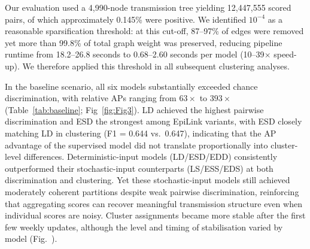 \documentclass[10pt,letterpaper]{article}
\begin{document}
Our evaluation used a 4{,}990-node transmission tree yielding 12{,}447{,}555 scored pairs, of which approximately 0.145\% were positive. We identified $10^{-4}$ as a reasonable sparsification threshold: at this cut-off, 87--97\% of edges were removed yet more than 99.8\% of total graph weight was preserved, reducing pipeline runtime from 18.2--26.8 seconds to 0.68--2.60 seconds per model (10--39$\times$ speed-up). We therefore applied this threshold in all subsequent clustering analyses.

In the baseline scenario, all six models substantially exceeded chance discrimination, with relative APs ranging from $63\times$ to $393\times$ (Table~\ref{tab:baseline}; Fig~\ref{fig:Fig3}). LD achieved the highest pairwise discrimination and ESD the strongest among EpiLink variants, with ESD closely matching LD in clustering (F1 = 0.644 vs.\ 0.647), indicating that the AP advantage of the supervised model did not translate proportionally into cluster-level differences. Deterministic-input models (LD/ESD/EDD) consistently outperformed their stochastic-input counterparts (LS/ESS/EDS) at both discrimination and clustering. Yet these stochastic-input models still achieved moderately coherent partitions despite weak pairwise discrimination, reinforcing that aggregating scores can recover meaningful transmission structure even when individual scores are noisy. Cluster assignments became more stable after the first few weekly updates, although the level and timing of stabilisation varied by model (Fig.~).
\end{document}
